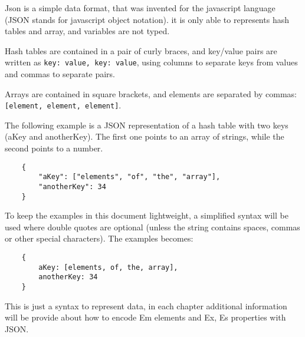 Json is a simple data format, that was invented for the javascript language (JSON stands for javascript object notation). it is only able to represents hash tables and array, and variables are not typed.

Hash tables are contained in a pair of curly braces, and key/value pairs are written as \texttt{key: value, key: value}, using columns to separate keys from values and commas to separate pairs.

Arrays are contained in square brackets, and elements are separated by commas: \texttt{[element, element, element]}.

The following example is a JSON representation of a hash table with two keys (aKey and anotherKey). The first one points to an array of strings, while the second points to a number.
\begin{verbatim}
    {
        "aKey": ["elements", "of", "the", "array"],
        "anotherKey": 34
    }
\end{verbatim}

To keep the examples in this document lightweight, a simplified syntax will be used where double quotes are optional (unless the string contains spaces, commas or other special characters). The examples becomes:

\begin{verbatim}
    {
        aKey: [elements, of, the, array],
        anotherKey: 34
    }
\end{verbatim}

This is just a syntax to represent data, in each chapter additional information will be provide about how to encode Em elements and Ex, Es properties with JSON.
